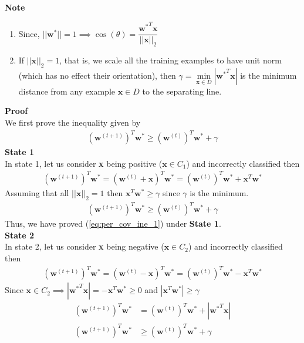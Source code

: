 \textbf{Note}
\begin{enumerate}
  \item Since, $||\textbf{w}^{*}|| = 1 \implies \cos (\theta) = \dfrac{{\textbf{w}^*}^T\textbf{x}}{||\textbf{x}||_2}$
  \item If $||\textbf{x}||_2 = 1$, that is, we scale all the training examples to have unit norm (which has no effect their orientation), then $\gamma = \underset{\textbf{x}\in D}{\min} |{\textbf{w}^*}^T\textbf{x}|$ is the minimum distance from any example $\textbf{x} \in D$ to the separating line.
\end{enumerate}
\textbf{Proof}\\
We first prove the inequality given by 
\begin{align}
  (\textbf{w}^ {(t+1)})^T\textbf{w}^{*} \geq (\textbf{w}^ {(t)})^T\textbf{w}^{*} + \gamma
  \label{eq:per_cov_ine_1}
\end{align}
\indent \textbf{State 1} \\
In state 1, let us consider \textbf{x} being positive ($\textbf{x} \in C_1$) and incorrectly classified then
\begin{align}
  \nonumber
  (\textbf{w}^ {(t+1)})^T\textbf{w}^{*} = (\textbf{w}^ {(t)} + \textbf{x})^T\textbf{w}^{*} =   (\textbf{w}^ {(t)})^T\textbf{w}^{*} + \textbf{x}^T\textbf{w}^{*}
\end{align}
Assuming that all $||\textbf{x}||_2 = 1$ then $\textbf{x}^T\textbf{w}^{*} \geq \gamma$ since $\gamma$ is the minimum. 
\begin{align}
  \label{eq:per_cov_ine_2}
  (\textbf{w}^ {(t+1)})^T\textbf{w}^{*} \geq (\textbf{w}^ {(t)})^T\textbf{w}^{*} + \gamma
\end{align}
Thus, we have proved (\ref{eq:per_cov_ine_1})  under \textbf{State 1}.\\
\indent \textbf{State 2} \\
In state 2, let us consider \textbf{x} being negative ($\textbf{x} \in C_2$) and incorrectly classified then
\begin{align}
  \nonumber
  (\textbf{w}^ {(t+1)})^T\textbf{w}^{*} = (\textbf{w}^ {(t)} - \textbf{x})^T\textbf{w}^{*} =   (\textbf{w}^ {(t)})^T\textbf{w}^{*} - \textbf{x}^T\textbf{w}^{*}
\end{align}
Since $\textbf{x} \in C_2 \implies |{\textbf{w}^*}^T\textbf{x}| = - \textbf{x}^T\textbf{w}^* \geq 0$ and $|\textbf{x}^T\textbf{w}^{*}| \geq \gamma$
\begin{align}
  \nonumber
  (\textbf{w}^ {(t+1)})^T\textbf{w}^{*} &= (\textbf{w}^ {(t)})^T\textbf{w}^{*} + |{\textbf{w}^*}^T\textbf{x}| \\
  \label{eq:per_cov_ine_3}
  (\textbf{w}^ {(t+1)})^T\textbf{w}^{*} &\geq (\textbf{w}^ {(t)})^T\textbf{w}^{*} + \gamma
\end{align}
